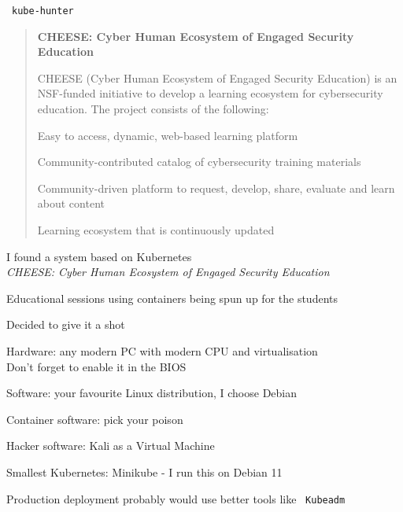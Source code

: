 \documentclass[Screen16to9,17pt]{foils}
\begin{document}


\faWrench\ \verb+kube-hunter+



\begin{quote}
{\bf CHEESE: Cyber Human Ecosystem of Engaged Security Education}

CHEESE (Cyber Human Ecosystem of Engaged Security Education) is an NSF-funded initiative to develop a learning ecosystem for cybersecurity education. The project consists of the following:

\begin{list2}
\item Easy to access, dynamic, web-based learning platform
\item Community-contributed catalog of cybersecurity training materials
\item Community-driven platform to request, develop, share, evaluate and learn about content
\item Learning ecosystem that is continuously updated
\end{list2}
\end{quote}

\begin{list2}
\item I found a system based on Kubernetes \\
\emph{CHEESE: Cyber Human Ecosystem of Engaged Security Education}\\
\item Educational sessions using containers being spun up for the students
\item Decided to give it a shot
\end{list2}




\begin{list2}
\item Hardware: any modern PC with modern CPU and virtualisation\\
Don't forget to enable it in the BIOS
\item Software: your favourite Linux distribution, I choose Debian
\item Container software: pick your poison
\item Hacker software: Kali as a Virtual Machine 
\item Smallest Kubernetes: Minikube -  I run this on Debian 11
\item Production deployment probably would use better tools like \faWrench\ \verb+Kubeadm+
\end{list2}
\end{document}
